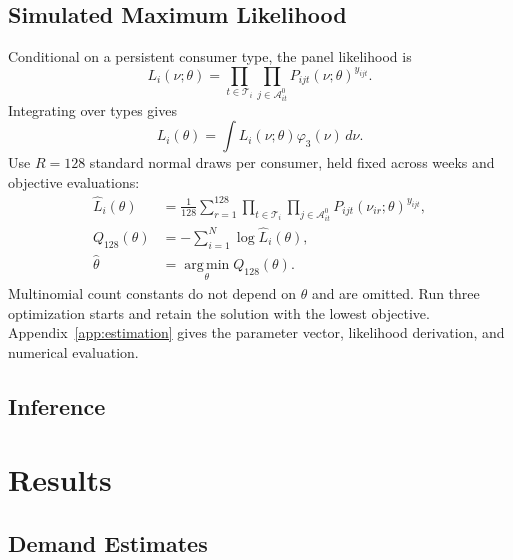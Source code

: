 \documentclass[12pt]{article}
\theoremstyle{definition}
\theoremstyle{remark}
\newcommand{\argmin}{\operatorname*{arg\,min}}
\begin{document}
\subsection{Simulated Maximum Likelihood}
\label{subsec:estimation-procedure}
Conditional on a persistent consumer type, the panel likelihood is
\begin{equation}
 L_i(\nu;\theta)=\prod_{t\in\mathcal T_i}
 \prod_{j\in\mathcal A_{it}^0}P_{ijt}(\nu;\theta)^{y_{ijt}}.
\end{equation}
Integrating over types gives
\begin{equation}
 L_i(\theta)=\int L_i(\nu;\theta)\varphi_3(\nu)\,d\nu.
\end{equation}
Use $R=128$ standard normal draws per consumer, held fixed across weeks and
objective evaluations:
\begin{align}
 \widehat L_i(\theta)&=\frac{1}{128}\sum_{r=1}^{128}
 \prod_{t\in\mathcal T_i}\prod_{j\in\mathcal A_{it}^0}
 P_{ijt}(\nu_{ir};\theta)^{y_{ijt}},\\
 Q_{128}(\theta)&=-\sum_{i=1}^N\log\widehat L_i(\theta),
 \label{eq:estimation-objective}\\
 \widehat\theta&=\argmin_\theta Q_{128}(\theta).
\end{align}
Multinomial count constants do not depend on $\theta$ and are omitted.
Run three optimization starts and retain the solution with the lowest objective.
Appendix~\ref{app:estimation} gives the parameter vector, likelihood derivation,
and numerical evaluation.

\subsection{Inference}


\section{Results}
\label{sec:results}

\subsection{Demand Estimates}


\FloatBarrier

\FloatBarrier
\end{document}
